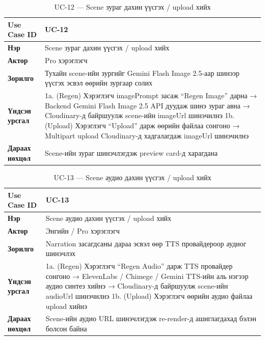 \begin{table}[H]
\centering
\label{tab:uc12}
\begin{tabular}{|l|p{9.5cm}|}
\hline
\textbf{Use Case ID} & UC-12 \\
\hline
\textbf{Нэр} & Scene зураг дахин үүсгэх / upload хийх \\
\hline
\textbf{Актор} & Pro хэрэглэгч \\
\hline
\textbf{Зорилго} & Тухайн scene-ийн зургийг Gemini Flash Image 2.5-аар шинээр үүсгэх эсвэл өөрийн зургаар солих \\
\hline
\textbf{Үндсэн урсгал} &
1a. (Regen) Хэрэглэгч imagePrompt засаж ``Regen Image'' дарна \newline
\hspace{0.5cm} → Backend Gemini Flash Image 2.5 API дуудаж шинэ зураг авна \newline
\hspace{0.5cm} → Cloudinary-д байршуулж scene-ийн imageUrl шинэчилнэ \newline
1b. (Upload) Хэрэглэгч ``Upload'' дарж өөрийн файлаа сонгоно \newline
\hspace{0.5cm} → Multipart upload Cloudinary-д хадгалагдаж imageUrl шинэчилнэ \\
\hline
\textbf{Дараах нөхцөл} & Scene-ийн зураг шинэчлэгдэж preview card-д харагдана \\
\hline
\end{tabular}
\caption{UC-12 --- Scene зураг дахин үүсгэх / upload хийх}
\end{table}

\begin{table}[H]
\centering
\label{tab:uc13}
\begin{tabular}{|l|p{9.5cm}|}
\hline
\textbf{Use Case ID} & UC-13 \\
\hline
\textbf{Нэр} & Scene аудио дахин үүсгэх / upload хийх \\
\hline
\textbf{Актор} & Энгийн / Pro хэрэглэгч \\
\hline
\textbf{Зорилго} & Narration засагдсаны дараа эсвэл өөр TTS провайдероор аудиог шинэчлэх \\
\hline
\textbf{Үндсэн урсгал} &
1a. (Regen) Хэрэглэгч ``Regen Audio'' дарж TTS провайдер сонгоно \newline
\hspace{0.5cm} → ElevenLabs / Chimege / Gemini TTS-ийн аль нэгээр аудио синтез хийнэ \newline
\hspace{0.5cm} → Cloudinary-д байршуулж scene-ийн audioUrl шинэчилнэ \newline
1b. (Upload) Хэрэглэгч өөрийн аудио файлаа upload хийнэ \\
\hline
\textbf{Дараах нөхцөл} & Scene-ийн аудио URL шинэчлэгдэж re-render-д ашиглагдахад бэлэн болсон байна \\
\hline
\end{tabular}
\caption{UC-13 --- Scene аудио дахин үүсгэх / upload хийх}
\end{table}

